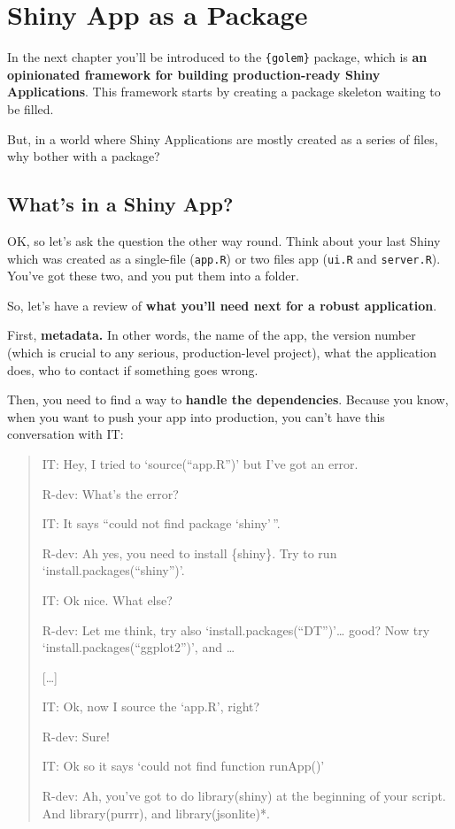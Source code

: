 \documentclass[]{book}
\begin{document}
\hypertarget{shiny-app-as-a-package}{%
\section{Shiny App as a Package}\label{shiny-app-as-a-package}}

In the next chapter you'll be introduced to the \texttt{\{golem\}} package, which is \textbf{an opinionated framework for building production-ready Shiny Applications}. This framework starts by creating a package skeleton waiting to be filled.

But, in a world where Shiny Applications are mostly created as a series of files, why bother with a package?

\hypertarget{whats-in-a-shiny-app}{%
\subsection{What's in a Shiny App?}\label{whats-in-a-shiny-app}}

OK, so let's ask the question the other way round. Think about your last Shiny which was created as a single-file (\texttt{app.R}) or two files app (\texttt{ui.R} and \texttt{server.R}). You've got these two, and you put them into a folder.

So, let's have a review of \textbf{what you'll need next for a robust application}.

First, \textbf{metadata.} In other words, the name of the app, the version number (which is crucial to any serious, production-level project), what the application does, who to contact if something goes wrong.

Then, you need to find a way to \textbf{handle the dependencies}. Because you know, when you want to push your app into production, you can't have this conversation with IT:

\begin{quote}
IT: Hey, I tried to `source(``app.R'')' but I've got an error.

R-dev: What's the error?

IT: It says ``could not find package `shiny'\,''.

R-dev: Ah yes, you need to install \{shiny\}. Try to run `install.packages(``shiny'')'.

IT: Ok nice. What else?

R-dev: Let me think, try also `install.packages(``DT'')'\ldots{} good? Now try `install.packages(``ggplot2'')', and \ldots{}

{[}\ldots{}{]}

IT: Ok, now I source the `app.R', right?

R-dev: Sure!

IT: Ok so it says `could not find function runApp()'

R-dev: Ah, you've got to do library(shiny) at the beginning of your script. And library(purrr), and library(jsonlite)*.
\end{quote}
\end{document}
